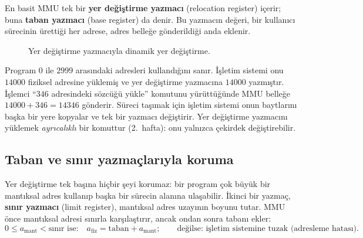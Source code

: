 \documentclass[11pt,a4paper]{article}
\newcommand{\term}[1]{\textbf{\color{mintdeep}#1}}
\begin{document}
En basit MMU tek bir \term{yer değiştirme yazmacı} (relocation register) içerir; buna \term{taban yazmacı} (base register) da denir. Bu yazmacın değeri, bir kullanıcı sürecinin ürettiği her adrese, adres belleğe gönderildiği anda eklenir.

\begin{figure}[H]
\centering
{}
\caption{Yer değiştirme yazmacıyla dinamik yer değiştirme.}
\end{figure}

Program $0$ ile $2999$ arasındaki adresleri kullandığını sanır. İşletim sistemi onu $14000$ fiziksel adresine yüklemiş ve yer değiştirme yazmacına $14000$ yazmıştır. İşlemci ``$346$ adresindeki sözcüğü yükle'' komutunu yürüttüğünde MMU belleğe $14000 + 346 = 14346$ gönderir. Süreci taşımak için işletim sistemi onun baytlarını başka bir yere kopyalar ve tek bir yazmacı değiştirir. Yer değiştirme yazmacını yüklemek \emph{ayrıcalıklı} bir komuttur (2.~hafta): onu yalnızca çekirdek değiştirebilir.

\subsection{Taban ve sınır yazmaçlarıyla koruma}

Yer değiştirme tek başına hiçbir şeyi korumaz: bir program çok büyük bir mantıksal adres kullanıp başka bir sürecin alanına ulaşabilir. İkinci bir yazmaç, \term{sınır yazmacı} (limit register), mantıksal adres uzayının boyunu tutar. MMU önce mantıksal adresi sınırla karşılaştırır, ancak ondan sonra tabanı ekler:
\[
0 \le a_{\text{mant}} < \text{sınır ise:}\quad a_{\text{fiz}} = \text{taban} + a_{\text{mant}};
\qquad \text{değilse: işletim sistemine tuzak (adresleme hatası).}
\]
\end{document}
